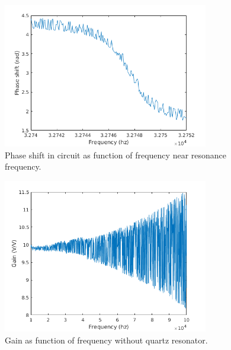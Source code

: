 \documentclass[12pt]{article}
\begin{document}
\begin{figure}[!ht]
\centering
\includegraphics[width = 0.8\textwidth]{kuvat/f-ps_res.png}
\caption{Phase shift in circuit as function of frequency near resonance frequency.}
\label{fig:f-ps_res}
\end{figure}


\begin{figure}[!ht]
\centering
\includegraphics[width = 0.8\textwidth]{kuvat/nsr.png}
\caption{Gain as function of frequency without quartz resonator.}
\label{fig:nsr}
\end{figure}
\end{document}
